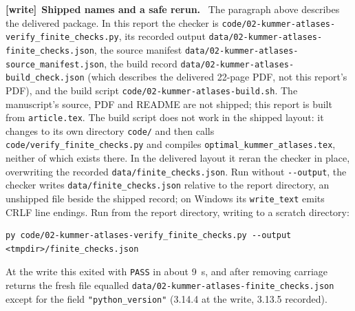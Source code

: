 \documentclass[11pt,a4paper]{article}
\theoremstyle{definition}
\theoremstyle{remark}
\newcommand{\code}[1]{{\small\nolinkurl{#1}}}
\newenvironment{writenote}[1][]{\par\smallskip\begingroup\small
 \noindent\textbf{[write]}\if\relax\detokenize{#1}\relax\else~\textbf{#1.}\fi\ }%
 {\par\endgroup\smallskip}
\begin{document}
\begin{writenote}[Shipped names and a safe rerun]
The paragraph above describes the delivered package. In this report the
checker is \code{code/02-kummer-atlases-verify_finite_checks.py}, its recorded
output \code{data/02-kummer-atlases-finite_checks.json}, the source manifest
\code{data/02-kummer-atlases-source_manifest.json}, the build record
\code{data/02-kummer-atlases-build_check.json} (which describes the delivered
22-page PDF, not this report's PDF), and the build script
\code{code/02-kummer-atlases-build.sh}. The manuscript's source, PDF and
README are not shipped; this report is built from \code{article.tex}.
The build script does not work in the shipped layout: it changes to its own
directory \code{code/} and then calls \code{code/verify_finite_checks.py} and
compiles \code{optimal_kummer_atlases.tex}, neither of which exists there.
In the delivered layout it reran the checker in place, overwriting the
recorded \code{data/finite_checks.json}. Run without \code{--output}, the
checker writes \code{data/finite_checks.json} relative to the report
directory, an unshipped file beside the shipped record; on Windows its
\code{write_text} emits CRLF line endings. Run from the report directory,
writing to a scratch directory:
\begin{lstlisting}
py code/02-kummer-atlases-verify_finite_checks.py --output <tmpdir>/finite_checks.json
\end{lstlisting}
At the write this exited with \code{PASS} in about 9~s, and after removing
carriage returns the fresh file equalled
\code{data/02-kummer-atlases-finite_checks.json} except for the field
\code{"python_version"} (3.14.4 at the write, 3.13.5 recorded).
\end{writenote}
\end{document}
